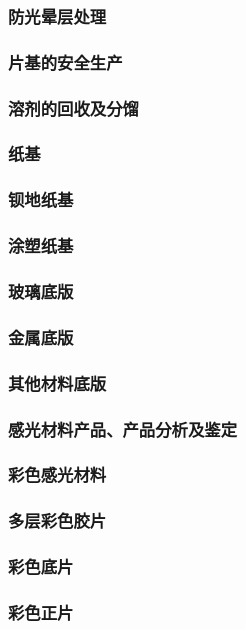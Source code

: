 \documentclass[UTF8]{../../ApplicationUniverse}
\begin{document}
            \subsubsection{防光晕层处理}
        \subsubsection{片基的安全生产}
        \subsubsection{溶剂的回收及分馏}
    \subsubsection{纸基}
        \subsubsection{钡地纸基}
        \subsubsection{涂塑纸基}
    \subsubsection{玻璃底版}
    \subsubsection{金属底版}
    \subsubsection{其他材料底版}
\subsubsection{感光材料产品、产品分析及鉴定}
    \subsubsection{彩色感光材料}
        \subsubsection{多层彩色胶片}
            \subsubsection{彩色底片}
            \subsubsection{彩色正片}
\end{document}
